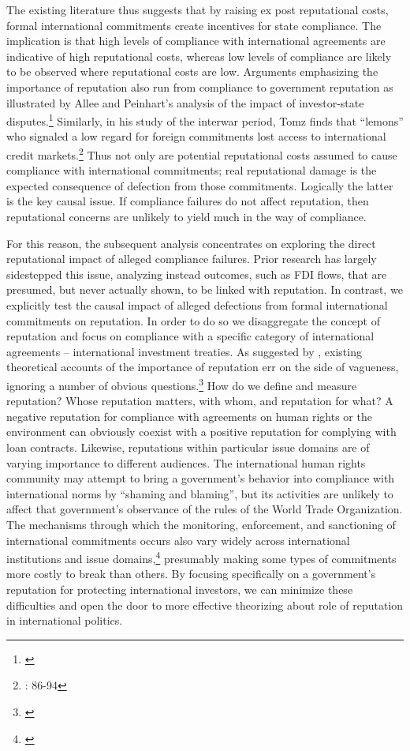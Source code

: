 \documentclass[12pt,onesided]{amsart}
\begin{document}
The existing literature thus suggests that by raising ex post reputational costs, formal international commitments create incentives for state compliance. The implication is that high levels of compliance with international agreements are indicative of high reputational costs, whereas low levels of compliance are likely to be observed where reputational costs are low. Arguments emphasizing the importance of reputation also run from compliance to government reputation as illustrated by Allee and Peinhart's analysis of the impact of investor-state disputes.\footnote{\citet{allee:peinhardt:2011}} Similarly, in his study of the interwar period, Tomz finds that ``lemons'' who signaled a low regard for foreign commitments lost access to international credit markets.\footnote{\citet{tomz:2007}: 86-94} Thus not only are potential reputational costs assumed to cause compliance with international commitments; real reputational damage is the expected consequence of defection from those commitments. Logically the latter is the key causal issue. If compliance failures do not affect reputation, then reputational concerns are unlikely to yield much in the way of compliance.

For this reason, the subsequent analysis concentrates on exploring the direct reputational impact of alleged compliance failures. Prior research has largely sidestepped this issue, analyzing instead outcomes, such as FDI flows, that are presumed, but never actually shown, to be linked with reputation. In contrast, we explicitly test the causal impact of alleged defections from formal international commitments on reputation. In order to do so we disaggregate the concept of reputation and focus on compliance with a specific category of international agreements -- international investment treaties. As suggested by \citeauthor{brewster:2009}, existing theoretical accounts of the importance of reputation err on the side of vagueness, ignoring a number of obvious questions.\footnote{\citet{brewster:2009}} How do we define and measure reputation? Whose reputation matters, with whom, and reputation for what? A negative reputation for compliance with agreements on human rights or the environment can obviously coexist with a positive reputation for complying with loan contracts. Likewise, reputations within particular issue domains are of varying importance to different audiences. The international human rights community may attempt to bring a government's behavior into compliance with international norms by ``shaming and blaming'', but its activities are unlikely to affect that government's observance of the rules of the World Trade Organization. The mechanisms through which the monitoring, enforcement, and sanctioning of international commitments occurs also vary widely across international institutions and issue domains,\footnote{\citet{gaukordger:gordon:2012}} presumably making some types of commitments more costly to break than others. By focusing specifically on a government's reputation for protecting international investors, we can minimize these difficulties and open the door to more effective theorizing about role of reputation in international politics.
\end{document}
